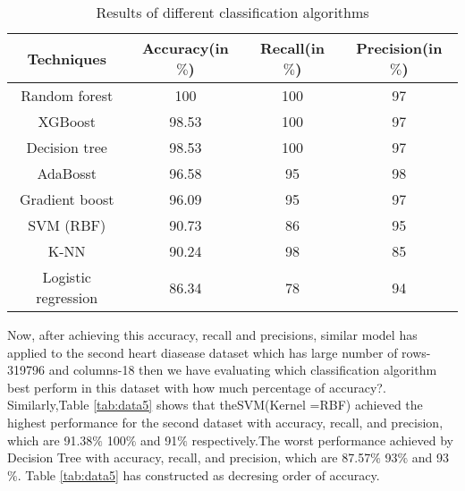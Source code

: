 \documentclass[11pt]{article}
\begin{document}
\begin{table}[H]
\caption{ Results of different classification algorithms}

\centering
\def\arraystretch{0.9}
\begin{tabular}{|c|c|c|c|}
\hline
Techniques      &    Accuracy(in $\%$) &  Recall(in $\%$)           &   Precision(in $\%$)  \\ \hline
Random forest   &     100			&  100		   &    97\\
XGBoost          &       98.53      &  100          &       97\\
Decision tree  &       98.53			&  100		   &     97\\
AdaBosst          &      96.58      &  95           &      98\\    
Gradient boost    &     96.09       &  95           &      97 \\ 
SVM (RBF)	     &     90.73        &  86			&    95   \\ 
K-NN 		  &         90.24       &   98		   &     85\\
Logistic regression &    86.34		&   78         &      94\\ 
   \hline

\end{tabular}
\label{tab:data4}
\end{table}
Now, after achieving this accuracy, recall and precisions, similar model has applied to the second heart diasease dataset which has large number of rows-319796 and columns-18 then we have evaluating which classification algorithm best perform in this dataset with how much percentage of accuracy?.
Similarly,Table  \ref{tab:data5} shows that theSVM(Kernel =RBF) achieved the highest performance for the second dataset with accuracy, recall, and precision, which are 91.38$\%$ 100$\%$  and  91$\%$ respectively.The worst performance achieved by Decision Tree with accuracy, recall, and precision, which are 87.57$\%$ 93$\%$  and  93$\%$. Table  \ref{tab:data5} has constructed  as decresing order of accuracy.
\end{document}
